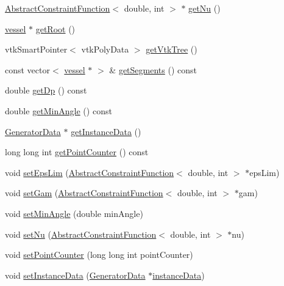\begin{DoxyCompactItemize}
\hyperlink{class_abstract_constraint_function}{Abstract\+Constraint\+Function}$<$ double, int $>$ $\ast$ \hyperlink{class_abstract_structured_c_c_o_tree_ad215df279dbc1eaf0f5128836c287819}{get\+Nu} ()
\item 
\hyperlink{structvessel}{vessel} $\ast$ \hyperlink{class_abstract_structured_c_c_o_tree_a8db5e5d1d1e0ebfc8c0a464ab59f916f}{get\+Root} ()
\item 
vtk\+Smart\+Pointer$<$ vtk\+Poly\+Data $>$ \hyperlink{class_abstract_structured_c_c_o_tree_a39f4b8a140cafb99d4fbf65b7d042d88}{get\+Vtk\+Tree} ()
\item 
const vector$<$ \hyperlink{structvessel}{vessel} $\ast$ $>$ \& \hyperlink{class_abstract_structured_c_c_o_tree_af06ce1d020f29716c42a57ea6c103ef1}{get\+Segments} () const 
\item 
double \hyperlink{class_abstract_structured_c_c_o_tree_a35151df888863067191f01d7aa88f0fd}{get\+Dp} () const 
\item 
double \hyperlink{class_abstract_structured_c_c_o_tree_aa4c2e32280c2df85be165b5f53175b9c}{get\+Min\+Angle} () const 
\item 
\hyperlink{class_generator_data}{Generator\+Data} $\ast$ \hyperlink{class_abstract_structured_c_c_o_tree_a343ffe5c45fe18d60b5fd78530dc24f4}{get\+Instance\+Data} ()
\item 
long long int \hyperlink{class_abstract_structured_c_c_o_tree_a7e46f512fe32e55e58d6a1c06dd8bccc}{get\+Point\+Counter} () const 
\item 
void \hyperlink{class_abstract_structured_c_c_o_tree_a1b92fc42f2efdc459d96b12776f54b8f}{set\+Eps\+Lim} (\hyperlink{class_abstract_constraint_function}{Abstract\+Constraint\+Function}$<$ double, int $>$ $\ast$eps\+Lim)
\item 
void \hyperlink{class_abstract_structured_c_c_o_tree_a479ac782dcb0132a178013ef7b113bbf}{set\+Gam} (\hyperlink{class_abstract_constraint_function}{Abstract\+Constraint\+Function}$<$ double, int $>$ $\ast$gam)
\item 
void \hyperlink{class_abstract_structured_c_c_o_tree_ad48f5dd124e15a246d21495e78f96412}{set\+Min\+Angle} (double min\+Angle)
\item 
void \hyperlink{class_abstract_structured_c_c_o_tree_a01f0e3090e61c48d760c25688228a5b2}{set\+Nu} (\hyperlink{class_abstract_constraint_function}{Abstract\+Constraint\+Function}$<$ double, int $>$ $\ast$nu)
\item 
void \hyperlink{class_abstract_structured_c_c_o_tree_a49368c8d7c34f941694cd5cd42a79922}{set\+Point\+Counter} (long long int point\+Counter)
\item 
void \hyperlink{class_abstract_structured_c_c_o_tree_ad19ef66f66f9fdfedfb3ecd47f32c9bd}{set\+Instance\+Data} (\hyperlink{class_generator_data}{Generator\+Data} $\ast$\hyperlink{class_abstract_structured_c_c_o_tree_af1836d7ed2156f3cf9cc311edfdc49b1}{instance\+Data})
\end{DoxyCompactItemize}

